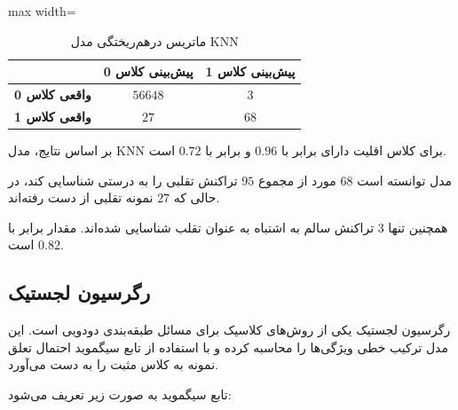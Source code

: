 \documentclass[10pt,a4paper,twocolumn]{article}
\begin{document}
\begin{table}[H]

\centering

\caption{ماتریس درهم‌ریختگی مدل KNN}

\vspace{0.15cm}

\begin{adjustbox}{max width=\columnwidth}

\begin{tabular}{|c|c|c|}

\hline

&
\textbf{پیش‌بینی کلاس 0} &
\textbf{پیش‌بینی کلاس 1} \\

\hline

\textbf{واقعی کلاس 0} &
$56648$ &
$3$ \\

\hline

\textbf{واقعی کلاس 1} &
$27$ &
$68$ \\

\hline

\end{tabular}

\end{adjustbox}

\label{tab:knn_confusion}

\end{table}

بر اساس نتایج، مدل KNN برای کلاس اقلیت دارای
 برابر با $0.96$ و
 برابر با $0.72$ است.

مدل توانسته است $68$ مورد از مجموع $95$ تراکنش تقلبی را
به درستی شناسایی کند، در حالی که $27$ نمونه تقلبی از دست
رفته‌اند.

همچنین تنها $3$ تراکنش سالم به اشتباه به عنوان تقلب
شناسایی شده‌اند. مقدار  برابر با $0.82$ است.


\subsection{رگرسیون لجستیک}

رگرسیون لجستیک یکی از روش‌های کلاسیک برای مسائل طبقه‌بندی
دودویی است. این مدل ترکیب خطی ویژگی‌ها را محاسبه کرده و
با استفاده از تابع سیگموید احتمال تعلق نمونه به کلاس مثبت
را به دست می‌آورد.

تابع سیگموید به صورت زیر تعریف می‌شود:
\end{document}
